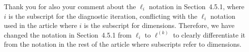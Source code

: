 \documentclass[11pt]{report}
\begin{document}

Thank you for also your comment about the $\ell_i$ notation in Section~4.5.1, where $i$ is the subscript for the diagnostic iteration, conflicting with the $\ell_i$ notation used in the article where $i$ is the subscript for dimensions. Therefore, we have changed the notation in Section~4.5.1 from $\ell_i$ to $\ell^{(k)}$ to clearly differentiate it from the notation in the rest of the article where subscripts refer to dimensions.



\end{document}
